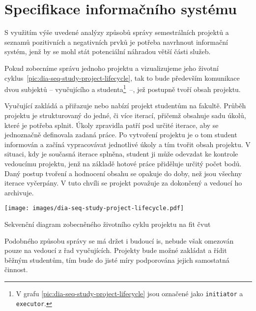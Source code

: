 \chapter{Specifikace informačního systému}

S využitím výše uvedené analýzy způsobů správy semestrálních projektů a seznamů pozitivních a negativních prvků je potřeba navrhnout informační systém, jenž by se mohl stát potenciální náhradou větší části služeb. 

Pokud zobecníme správu jednoho projektu a vizualizujeme jeho životní
cyklus~\ref{pic:dia-seq-study-project-lifecycle}, tak to bude především komunikace dvou subjektů -- vyučujícího a studenta\footnote{V grafu \ref{pic:dia-seq-study-project-lifecycle} jsou označené jako \texttt{initiator} a \texttt{executor}.}~--, jež postupně tvoří obsah projektu.

Vyučující zakládá a přiřazuje nebo nabízí projekt studentům na fakultě. Průběh projektu je strukturovaný do jedné, či více iterací, přičemž obsahuje sadu úkolů, které je potřeba splnit. Úkoly zpravidla patří pod určité iterace, aby se jednoznačně definovala zadaná práce. Po vytvoření projektu je o tom student informován a začíná vypracovávat jednotlivé úkoly a tím tvořit obsah projektu. V situaci, kdy je současná iterace splněna, student ji může odevzdat ke kontrole vedoucímu projektu, jenž na základě hotové práce přiděluje určitý počet bodů. Daný postup tvoření a hodnocení obsahu se opakuje do doby, než jsou všechny iterace vyčerpány. V tuto chvíli se projekt považuje za dokončený a vedoucí ho archivuje.


\begin{fig:illustration}
   \texttt{[image: images/dia-seq-study-project-lifecycle.pdf]}
   \caption[Zobecněný životní cyklus projektu]{Sekvenční diagram zobecněného životního cyklu projektu na \gls{fit} \gls{čvut}}\label{pic:dia-seq-study-project-lifecycle}
\end{fig:illustration}


Podobného způsobu správy se má držet i budoucí \gls{is}, nebude však omezován pouze na vedoucí z řad vyučujících. Projekty bude možné zakládat a řídit běžným studentům, tím bude do jisté míry podporována jejich samostatná činnost.




